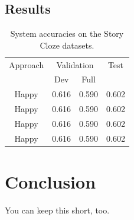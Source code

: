 \documentclass{article}
\begin{document}
\subsection{Results}
\begin{table}[h]
  \centering
  \begin{tabular}{ c c c c}
    \toprule
    Approach &  \multicolumn{2}{c}{Validation} & Test \\
     &  Dev & Full &  \\
    \midrule
    Happy & 0.616 & 0.590& 0.602\\
    Happy & 0.616 & 0.590& 0.602\\
    Happy & 0.616 & 0.590& 0.602\\
    Happy & 0.616 & 0.590& 0.602\\

    \bottomrule
  \end{tabular}
  \label{Tab:results}
  \caption{System accuracies on the Story Cloze datasets. }
\end{table}

\section{Conclusion}
You can keep this short, too.





\end{document}
